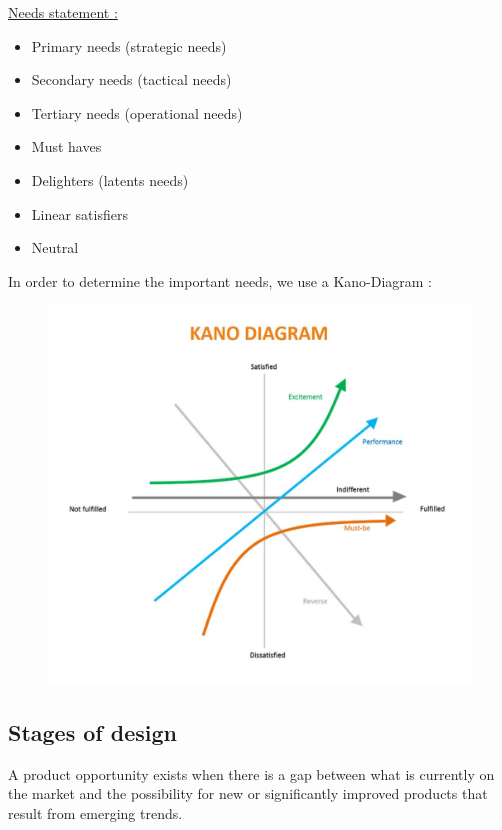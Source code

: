 \documentclass[../main.tex]{subfiles}
\begin{document}
\quad\underline{Needs statement :}\\
\begin{itemize}
    \item Primary needs (strategic needs)\\
    \item Secondary needs (tactical needs)\\
    \item Tertiary needs (operational needs)\\
    \item Must haves\\
    \item Delighters (latents needs)\\
    \item Linear satisfiers\\
    \item Neutral\\
\end{itemize}

In order to determine the important needs, we use a Kano-Diagram :\\
\begin{figure}
    \centering
    \includegraphics[width=\textwidth]{IMAGES/proddev/Kano+diagram-3561535844.jpeg}
\end{figure}

\subsection{Stages of design}
A product opportunity exists when there is a gap between what is currently on the market and the possibility for new or significantly improved products that result from emerging trends.\\
\end{document}
